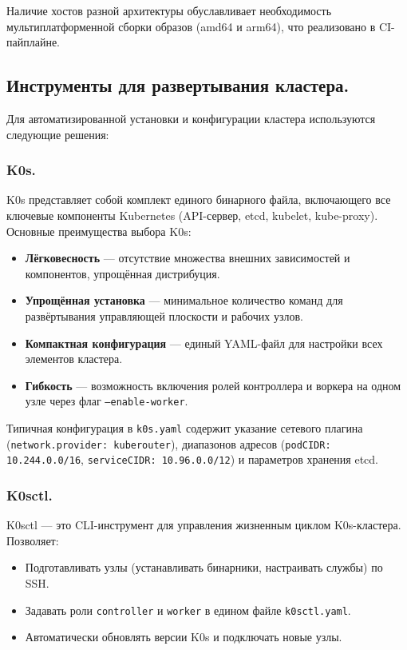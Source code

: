 \documentclass[14pt, a4paper]{extreport}
\begin{document}
Наличие хостов разной архитектуры обуславливает необходимость мультиплатформенной сборки образов (amd64 и arm64), что реализовано в CI-пайплайне.

\subsection{Инструменты для развертывания кластера.}

Для автоматизированной установки и конфигурации кластера используются следующие решения:

\subsubsection{K0s.}

K0s представляет собой комплект единого бинарного файла, включающего все ключевые компоненты Kubernetes (API-сервер, etcd, kubelet, kube-proxy). Основные преимущества выбора K0s:
\begin{itemize}
\item \textbf{Лёгковесность} — отсутствие множества внешних зависимостей и компонентов, упрощённая дистрибуция.
\item \textbf{Упрощённая установка} — минимальное количество команд для развёртывания управляющей плоскости и рабочих узлов.
\item \textbf{Компактная конфигурация} — единый YAML-файл для настройки всех элементов кластера.
\item \textbf{Гибкость} — возможность включения ролей контроллера и воркера на одном узле через флаг \texttt{--enable-worker}.
\end{itemize}

Типичная конфигурация в \texttt{k0s.yaml} содержит указание сетевого плагина (\texttt{network.provider: kuberouter}), диапазонов адресов (\texttt{podCIDR: 10.244.0.0/16}, \texttt{serviceCIDR: 10.96.0.0/12}) и параметров хранения etcd.

\subsubsection{K0sctl.}

K0sctl — это CLI-инструмент для управления жизненным циклом K0s-кластера. Позволяет:
\begin{itemize}
\item Подготавливать узлы (устанавливать бинарники, настраивать службы) по SSH.
\item Задавать роли \texttt{controller} и \texttt{worker} в едином файле \texttt{k0sctl.yaml}.
\item Автоматически обновлять версии K0s и подключать новые узлы.
\end{itemize}
\end{document}

